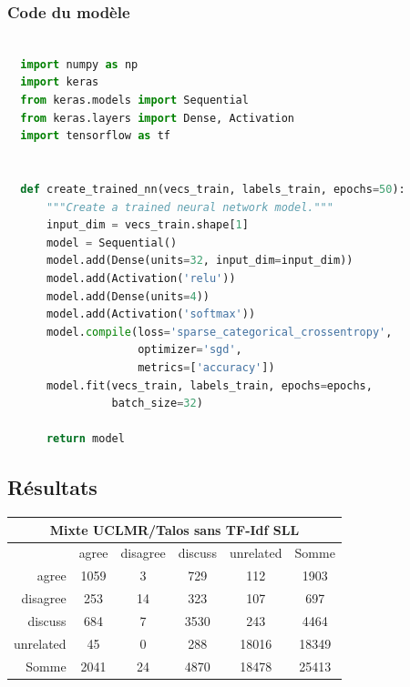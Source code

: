 \documentclass[11pt,a4paper,oldfontcommands]{memoir}
\begin{document}
\subsubsection{Code du modèle}
\begin{lstlisting}[language=Python]

  import numpy as np
  import keras
  from keras.models import Sequential
  from keras.layers import Dense, Activation
  import tensorflow as tf


  def create_trained_nn(vecs_train, labels_train, epochs=50):
      """Create a trained neural network model."""
      input_dim = vecs_train.shape[1]
      model = Sequential()
      model.add(Dense(units=32, input_dim=input_dim))
      model.add(Activation('relu'))
      model.add(Dense(units=4))
      model.add(Activation('softmax'))
      model.compile(loss='sparse_categorical_crossentropy',
                    optimizer='sgd',
                    metrics=['accuracy'])
      model.fit(vecs_train, labels_train, epochs=epochs,
                batch_size=32)

      return model
\end{lstlisting}



\subsection{Résultats}
\begin{center}
 \begin{tabular}{ r | c c c c | c }
  \multicolumn{6}{c}{Mixte UCLMR/Talos sans TF-Idf SLL}      \\
  \hline
            & agree & disagree & discuss & unrelated & Somme \\
  \hline
  agree     & 1059  & 3        & 729     & 112       & 1903  \\
  disagree  & 253   & 14       & 323     & 107       & 697   \\
  discuss   & 684   & 7        & 3530    & 243       & 4464  \\
  unrelated & 45    & 0        & 288     & 18016     & 18349 \\
  \hline
  Somme     & 2041  & 24       & 4870    & 18478     & 25413 \\
 \end{tabular}
\end{center}
\end{document}

